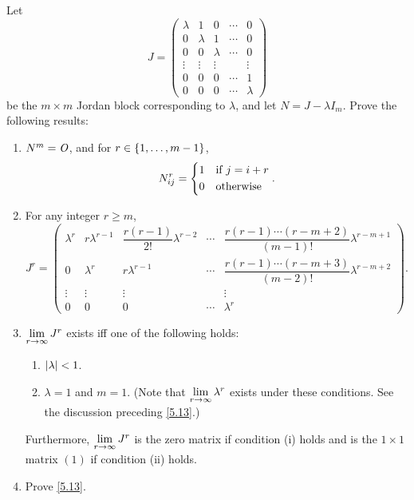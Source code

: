 \begin{ex}\label{ex:7.2.19}
  Let
  \[
    J = \begin{pmatrix}
      \lambda & 1       & 0       & \cdots & 0       \\
      0       & \lambda & 1       & \cdots & 0       \\
      0       & 0       & \lambda & \cdots & 0       \\
      \vdots  & \vdots  & \vdots  &        & \vdots  \\
      0       & 0       & 0       & \cdots & 1       \\
      0       & 0       & 0       & \cdots & \lambda
    \end{pmatrix}
  \]
  be the \(m \times m\) Jordan block corresponding to \(\lambda\), and let \(N = J - \lambda I_m\).
  Prove the following results:
  \begin{enumerate}
    \item \(N^m = \mathit{O}\), and for \(r \in \left\lbrace1, \dots, m - 1\right\rbrace\),
          \[
            N_{i j}^r = \begin{dcases}
              1 & \text{if } j = i + r \\
              0 & \text{otherwise}
            \end{dcases}.
          \]
    \item For any integer \(r \geq m\),
          \[
            J^r = \begin{pmatrix}
              \lambda^r & r \lambda^{r - 1} & \dfrac{r (r - 1)}{2!} \lambda^{r - 2} & \cdots & \dfrac{r(r - 1) \cdots (r - m + 2)}{(m - 1)!} \lambda^{r - m + 1} \\
              0         & \lambda^r         & r \lambda^{r - 1}                     & \cdots & \dfrac{r(r - 1) \cdots (r - m + 3)}{(m - 2)!} \lambda^{r - m + 2} \\
              \vdots    & \vdots            & \vdots                                &        & \vdots                                                            \\
              0         & 0                 & 0                                     & \cdots & \lambda^r
            \end{pmatrix}.
          \]
    \item \(\lim\limits_{r \to \infty} J^r\) exists iff one of the following holds:
          \begin{enumerate}[label=(\roman*)]
            \item \(\left\lvert\lambda\right\rvert < 1\).
            \item \(\lambda = 1\) and \(m = 1\).
                  (Note that \(\lim\limits_{r \to \infty} \lambda^r\) exists under these conditions.
                  See the discussion preceding \cref{5.13}.)
          \end{enumerate}
          Furthermore, \(\lim\limits_{r \to \infty} J^r\) is the zero matrix if condition (i) holds and is the \(1 \times 1\) matrix \((1)\) if condition (ii) holds.
    \item Prove \cref{5.13}.
  \end{enumerate}
\end{ex}

